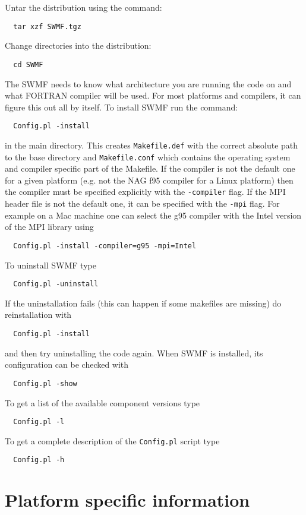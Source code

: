 Untar the distribution using the command:
\begin{verbatim}
  tar xzf SWMF.tgz
\end{verbatim}

Change directories into the distribution:
\begin{verbatim}
  cd SWMF
\end{verbatim}

The SWMF needs to know what architecture you are running the code on
and what FORTRAN compiler will be used.  For most platforms and compilers,
it can figure this out all by itself. To install SWMF run the command:
\begin{verbatim}
  Config.pl -install
\end{verbatim}
in the main directory. This creates {\tt Makefile.def} with
the correct absolute path to the base directory and {\tt Makefile.conf}
which contains the operating system and compiler specific part of
the Makefile. If the compiler is not the default one for a given
platform (e.g. not the NAG f95 compiler for a Linux platform) then
the compiler must be specified explicitly with the {\tt -compiler}
flag. If the MPI header file is not the default one, it can be
specified with the {\tt -mpi} flag. For example on a Mac machine
one can select the g95 compiler with the Intel version of the 
MPI library using
\begin{verbatim}
  Config.pl -install -compiler=g95 -mpi=Intel
\end{verbatim}
To uninstall SWMF type
\begin{verbatim}
  Config.pl -uninstall
\end{verbatim}
If the uninstallation fails (this can happen if some makefiles are missing)
do reinstallation with
\begin{verbatim}
  Config.pl -install
\end{verbatim}
and then try uninstalling the code again.
When SWMF is installed, its configuration can be checked with
\begin{verbatim}
  Config.pl -show
\end{verbatim}
To get a list of the available component versions type
\begin{verbatim}
  Config.pl -l
\end{verbatim}
To get a complete description of the {\tt Config.pl}  script type
\begin{verbatim}
  Config.pl -h
\end{verbatim}

\section{Platform specific information}

